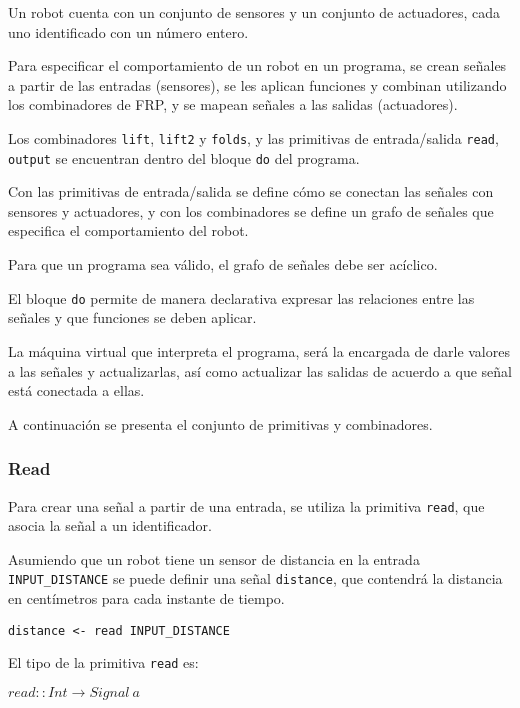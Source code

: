 
  Un robot cuenta con un conjunto de sensores y un conjunto de actuadores,
cada uno identificado con un número entero.

  Para especificar el comportamiento de un robot en un programa, se crean
señales a partir de las entradas (sensores), se les aplican funciones
y combinan utilizando los combinadores de FRP, y se mapean señales
a las salidas (actuadores).

  Los combinadores \texttt{lift}, \texttt{lift2} y \texttt{folds},
y las primitivas de entrada/salida \texttt{read}, \texttt{output} se
encuentran dentro del bloque \texttt{do} del programa.

  Con las primitivas de entrada/salida se define cómo se conectan
las señales con sensores y actuadores, y con los combinadores se
define un grafo de señales que especifica el comportamiento del robot.
  
  Para que un programa sea válido, el grafo de señales debe ser acíclico.

  El bloque \texttt{do} permite de manera declarativa expresar las
relaciones entre las señales y que funciones se deben aplicar.

  La máquina virtual que interpreta el programa, será la encargada de
darle valores a las señales y actualizarlas, así como actualizar las
salidas de acuerdo a que señal está conectada a ellas.

  A continuación se presenta el conjunto de primitivas y combinadores.

\subsubsection{Read}
  Para crear una señal a partir de una entrada, se utiliza la
primitiva \texttt{read}, que asocia la señal a un identificador.

  Asumiendo que un robot tiene un sensor de distancia en la entrada
\texttt{INPUT\_DISTANCE} se puede definir una señal \texttt{distance},
que contendrá la distancia en centímetros para cada instante de tiempo.

\begin{center}
\begin{Verbatim}[frame=single]
distance <- read INPUT_DISTANCE
\end{Verbatim}
\end{center}

El tipo de la primitiva \texttt{read} es:

\begin{center}
  $read :: Int \rightarrow Signal\ a $
\end{center}

